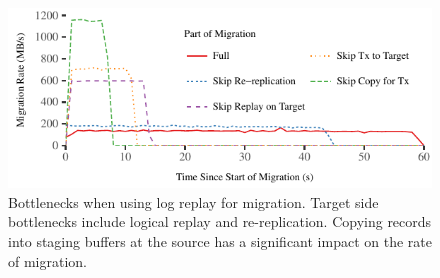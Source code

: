 \begin{figure}[t]
\includegraphics[width=\columnwidth]{graphs/migration-bottlenecks.pdf}
\caption{Bottlenecks when using log replay for migration. Target side
    bottlenecks include logical replay and re-replication.
    Copying records into staging buffers at the source has a
    significant impact on the rate of migration.}
\label{fig:bottlenecks}
\end{figure}
